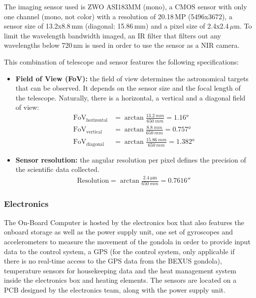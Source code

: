 The imaging sensor used is ZWO ASI183MM (mono), a CMOS sensor with only one channel (mono, not color) with a resolution of 20.18\,MP (5496x3672), a sensor size of 13.2x8.8\,mm (diagonal: 15.86\,mm) and a pixel size of 2.4x2.4\,$\mu$m. To limit the wavelength bandwidth imaged, an IR filter that filters out any wavelengths below 720\,nm is used in order to use the sensor as a NIR camera.

This combination of telescope and sensor features the following specifications:

\begin{itemize}
	\item \textbf{Field of View (FoV):} the field of view determines the astronomical targets that can be observed. It depends on the sensor size and the focal length of the telescope. Naturally, there is a horizontal, a vertical and a diagonal field of view:
	\begin{align}
		\text{FoV}_\text{horizontal} &= \arctan \frac{\SI{13.2}{mm}}{\SI{650}{mm}} = \ang{1,16} \\
		\text{FoV}_\text{vertical} &= \arctan \frac{\SI{8.8}{mm}}{\SI{650}{mm}} = \ang{0,757} \\
		\text{FoV}_\text{diagonal} &= \arctan \frac{\SI{15,86}{mm}}{\SI{650}{mm}} = \ang{1,382}
	\end{align}
	\item \textbf{Sensor resolution:} the angular resolution per pixel defines the precision of the scientific data collected.
	\begin{align}
		\text{Resolution} = \arctan \frac{\SI{2,4}{\um}}{\SI{650}{mm}} %
		 = \ang{;;0,7616}
	\end{align}
\end{itemize}



\subsubsection{Electronics}
The On-Board Computer is hosted by the electronics box that also features the onboard storage as well as the power supply unit, one set of gyroscopes and accelerometers to measure the movement of the gondola in order to provide input data to the control system, a GPS (for the control system, only applicable if there is no real-time access to the GPS data from the BEXUS gondola), temperature sensors for housekeeping data and the heat management system inside the electronics box and heating elements. The sensors are located on a PCB designed by the electronics team, along with the power supply unit. 

